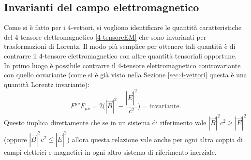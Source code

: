 \subsection{Invarianti del campo elettromagnetico}\label{sec:invariantiEM}
Come si è fatto per i 4-vettori, si vogliono identificare le quantità caratteristiche del 4-tensore elettromagnetico \eqref{4-tensoreEM} che sono invarianti per trasformazioni di Lorentz. Il modo più semplice per ottenere tali quantità è di contrarre il 4-tensore elettromagnetico con altre quantità tensoriali opportune.\\

In primo luogo è possibile contrarre il 4-tensore elettromagnetico controvariante con quello covariante (come si è già visto nella Sezione \ref{sec:4-vettori} questa è una quantità Lorentz invariante):
\begin{equation}
    F^{\mu\nu}F_{\mu\nu}=2\biggl(|\vec B|^2-\frac{|\vec E|^2}{c^2}\biggr)=\text{invariante}.
\end{equation}
Questo implica direttamente che se in un sistema di riferimento vale $|\vec B|^2c^2\geq|\vec E|^2$ (oppure $|\vec B|^2c^2\leq|\vec E|^2$) allora questa relazione vale anche per ogni altra coppia di campi elettrici e magnetici in ogni altro sistema di riferimento inerziale.\\

